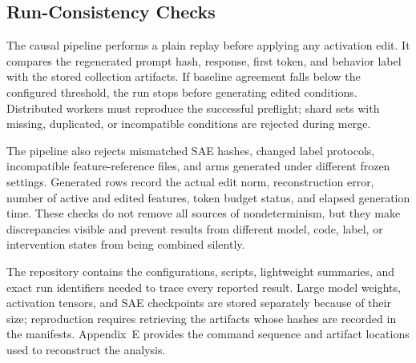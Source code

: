 \subsection{Run-Consistency Checks}

The causal pipeline performs a plain replay before applying any activation
edit. It compares the regenerated prompt hash, response, first token, and
behavior label with the stored collection artifacts. If baseline agreement
falls below the configured threshold, the run stops before generating edited
conditions. Distributed workers must reproduce the successful preflight; shard
sets with missing, duplicated, or incompatible conditions are rejected during
merge.

The pipeline also rejects mismatched SAE hashes, changed label protocols,
incompatible feature-reference files, and arms generated under different
frozen settings. Generated rows record the actual edit norm, reconstruction
error, number of active and edited features, token budget status, and elapsed
generation time. These checks do not remove all sources of nondeterminism, but
they make discrepancies visible and prevent results from different model,
code, label, or intervention states from being combined silently.

The repository contains the configurations, scripts, lightweight summaries,
and exact run identifiers needed to trace every reported result. Large model
weights, activation tensors, and SAE checkpoints are stored separately because
of their size; reproduction requires retrieving the artifacts whose hashes are
recorded in the manifests. Appendix~E provides the command sequence and
artifact locations used to reconstruct the analysis.
